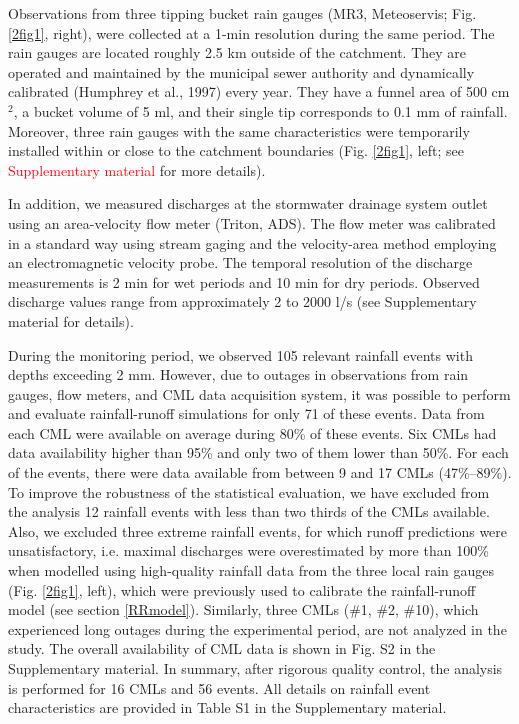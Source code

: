 \documentclass{ctuthesis}\usepackage[]{graphicx}\usepackage[]{color}
\begin{document}
Observations from three tipping bucket rain gauges (MR3, Meteoservis; Fig. \ref{2fig1}, right), were collected at a 1-min resolution during the same period. The rain gauges are located roughly 2.5 km outside of the catchment. They are operated and maintained by the municipal sewer authority and dynamically calibrated (Humphrey et al., 1997) every year. They have a funnel area of 500 cm$^2$, a bucket volume of 5 ml, and their single tip corresponds to 0.1 mm of rainfall. Moreover, three rain gauges with the same characteristics were temporarily installed within or close to the catchment boundaries (Fig. \ref{2fig1}, left; see \textcolor{red}{Supplementary material} for more details).

In addition, we measured discharges at the stormwater drainage system outlet using an area-velocity flow meter (Triton, ADS). The flow meter was calibrated in a standard way using stream gaging and the velocity-area method employing an electromagnetic velocity probe. The temporal resolution of the discharge measurements is 2 min for wet periods and 10 min for dry periods. Observed discharge values range from approximately 2 to 2000 l/s (see Supplementary material for details).

During the monitoring period, we observed 105 relevant rainfall events with depths exceeding 2 mm. However, due to outages in observations from rain gauges, flow meters, and CML data acquisition system, it was possible to perform and evaluate rainfall-runoff simulations for only 71 of these events. Data from each CML were available on average during 80\% of these events. Six CMLs had data availability higher than 95\% and only two of them lower than 50\%. For each of the events, there were data available from between 9 and 17 CMLs (47\%--89\%). To improve the robustness of the statistical evaluation, we have excluded from the analysis 12 rainfall events with less than two thirds of the CMLs available. Also, we excluded three extreme rainfall events, for which runoff predictions were unsatisfactory, i.e. maximal discharges were overestimated by more than 100\% when modelled using high-quality rainfall data from the three local rain gauges (Fig. \ref{2fig1}, left), which were previously used to calibrate the rainfall-runoff model (see section \ref{RRmodel}). Similarly, three CMLs (\#1, \#2, \#10), which experienced long outages during the experimental period, are not analyzed in the study. The overall availability of CML data is shown in Fig. S2 in the Supplementary material. In summary, after rigorous quality control, the analysis is performed for 16 CMLs and 56 events. All details on rainfall event characteristics are provided in Table S1 in the Supplementary material.
\end{document}
